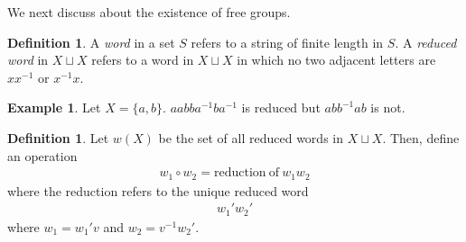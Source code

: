 \documentclass[12pt]{report}
\theoremstyle{plain}
\theoremstyle{remark}
\theoremstyle{definition}
\newtheorem{definition}[theorem]{Definition}
\newtheorem{example}[theorem]{Example}
\begin{document}
We next discuss about the existence of free groups.

\begin{definition}
    A \emph{word} in a set $S$ refers to a string of finite length in $S$. A \emph{reduced word} in $X\sqcup X$ refers to a word in $X\sqcup X$ in which no two adjacent letters are $xx^{-1}$ or $x^{-1}x$.
\end{definition}

\begin{example}
    Let $X=\{a,b\}$. $aabba^{-1}ba^{-1}$ is reduced but $abb^{-1}ab$ is not.
\end{example}

\begin{definition}
    Let $w(X)$ be the set of all reduced words in $X\sqcup X$. Then, define an operation
    \begin{align*}
        w_1\circ w_2 = \mathrm{reduction~of~}w_1w_2
    \end{align*}
    where the reduction refers to the unique reduced word
    \begin{align*}
        w_1'w_2'
    \end{align*}
    where $w_1=w_1'v$ and $w_2=v^{-1}w_2'$.
\end{definition}
\end{document}
